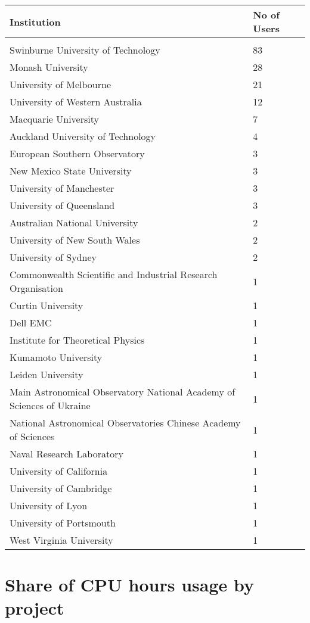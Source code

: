 \documentclass{article}%
\begin{document}
%
\begin{longtabu}{X[l] X[r]}%
\textbf{Institution}&\textbf{No of Users}\\%
\hline%
&\\%
Swinburne University of Technology&83\\%
\hline%
Monash University&28\\%
\hline%
University of Melbourne&21\\%
\hline%
University of Western Australia&12\\%
\hline%
Macquarie University&7\\%
\hline%
Auckland University of Technology&4\\%
\hline%
European Southern Observatory&3\\%
\hline%
New Mexico State University&3\\%
\hline%
University of Manchester&3\\%
\hline%
University of Queensland&3\\%
\hline%
Australian National University&2\\%
\hline%
University of New South Wales&2\\%
\hline%
University of Sydney&2\\%
\hline%
Commonwealth Scientific and Industrial Research Organisation&1\\%
\hline%
Curtin University&1\\%
\hline%
Dell EMC&1\\%
\hline%
Institute for Theoretical Physics&1\\%
\hline%
Kumamoto University&1\\%
\hline%
Leiden University&1\\%
\hline%
Main Astronomical Observatory National Academy of Sciences of Ukraine&1\\%
\hline%
National Astronomical Observatories Chinese Academy of Sciences&1\\%
\hline%
Naval Research Laboratory&1\\%
\hline%
University of California&1\\%
\hline%
University of Cambridge&1\\%
\hline%
University of Lyon&1\\%
\hline%
University of Portsmouth&1\\%
\hline%
West Virginia University&1\\%
\hline%
\end{longtabu}%
\section{Share of CPU hours usage by project}%
\end{document}
